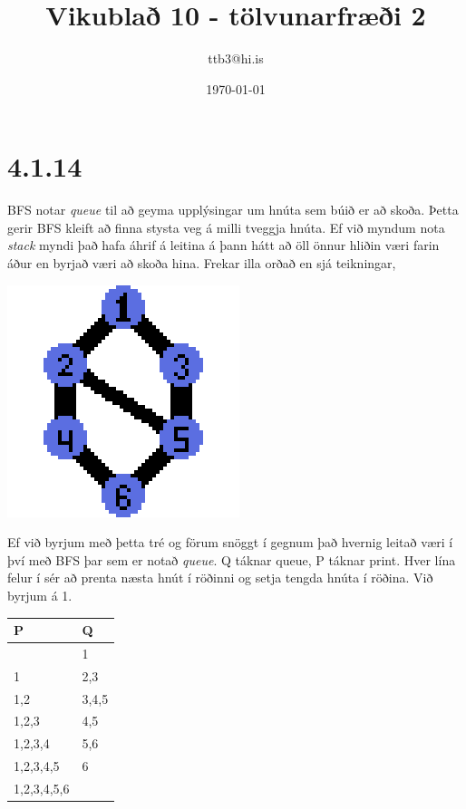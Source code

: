 \documentclass{article}
\title{Vikublað 10 - tölvunarfræði 2}
\author{ttb3@hi.is}
\date{\today}
\begin{document}
\maketitle

\section*{4.1.14}
BFS notar \emph{queue} til að geyma upplýsingar um hnúta sem búið er að skoða.
Þetta gerir BFS kleift að finna stysta veg á milli tveggja hnúta.
Ef við myndum nota \emph{stack} myndi það hafa áhrif á leitina á þann hátt að öll önnur hliðin væri farin áður en byrjað væri að skoða hina.
Frekar illa orðað en sjá teikningar,
\begin{center}
    \includegraphics{graph.png}
\end{center}
Ef við byrjum með þetta tré og förum snöggt í gegnum það hvernig leitað væri í því með BFS þar sem er notað \emph{queue}.
Q táknar queue, P táknar print. Hver lína felur í sér að prenta næsta hnút í röðinni og setja tengda hnúta í röðina. Við byrjum á 1.\\
\begin{center}
    \begin{tabular}{|l|l|}
        \hline
        P&Q\\
        \hline
                    &1\\
                    \hline
        1           &2,3\\
        \hline
        1,2         &3,4,5\\
        \hline
        1,2,3       &4,5\\
        \hline
        1,2,3,4     &5,6\\
        \hline
        1,2,3,4,5   &6\\
        \hline
        1,2,3,4,5,6 &\\
        \hline
    \end{tabular}
\end{center}
\end{document}
